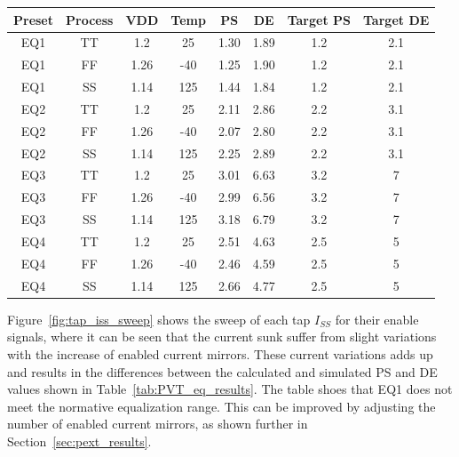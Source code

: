 \begin{center}
\label{tab:PVT_eq_results}
\begin{tabular}{cccccccc}
  \hline \hline
  \textbf{Preset} & \textbf{Process} & \textbf{VDD} & \textbf{Temp} & \textbf{PS} & \textbf{DE} & \textbf{Target PS} & \textbf{Target DE} \\
  \hline 
  EQ1 & TT & 1.2 & 25 & 1.30 & 1.89 & 1.2 & 2.1\\
  EQ1 & FF & 1.26 & -40 & 1.25 & 1.90 & 1.2 & 2.1\\
  EQ1 & SS & 1.14 & 125 & 1.44 & 1.84 & 1.2 & 2.1\\

  EQ2 & TT & 1.2 & 25 & 2.11 & 2.86 & 2.2 & 3.1\\
  EQ2 & FF & 1.26 & -40 & 2.07 & 2.80 & 2.2 & 3.1\\
  EQ2 & SS & 1.14 & 125 & 2.25 & 2.89 & 2.2 & 3.1\\

  EQ3 & TT & 1.2 & 25 & 3.01 & 6.63 & 3.2 & 7\\
  EQ3 & FF & 1.26 & -40 & 2.99 & 6.56 & 3.2 & 7\\
  EQ3 & SS & 1.14 & 125 & 3.18 & 6.79 & 3.2 & 7\\

  EQ4 & TT & 1.2 & 25 & 2.51 & 4.63 & 2.5 & 5\\
  EQ4 & FF & 1.26 & -40 & 2.46 & 4.59 & 2.5 & 5\\
  EQ4 & SS & 1.14 & 125 & 2.66 & 4.77 & 2.5 & 5\\
  \hline \hline
\end{tabular}
\end{center}

Figure~\ref{fig:tap_iss_sweep} shows the sweep of each tap $I_{SS}$ for their enable signals, where it can be seen that the current sunk suffer from slight variations with the increase of enabled current mirrors. These current variations adds up and results in the differences between the calculated and simulated \ac{PS} and \ac{DE} values shown in Table~\ref{tab:PVT_eq_results}. 
The table shoes that EQ1 does not meet the normative equalization range. This can be improved by adjusting the number of enabled current mirrors, as shown further in Section~\ref{sec:pext_results}.

